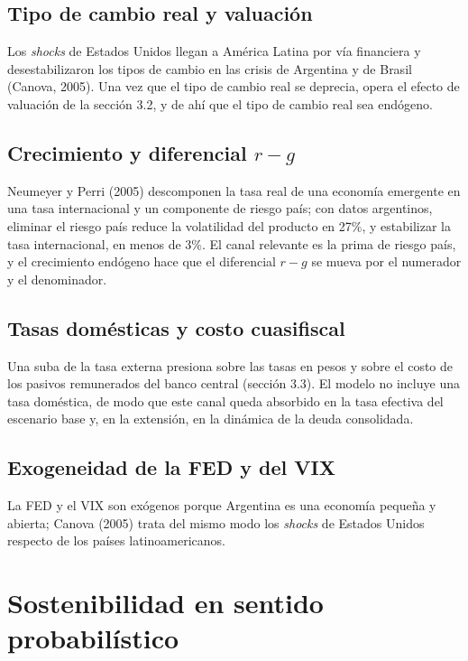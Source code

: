 \subsection{Tipo de cambio real y valuación}

Los \emph{shocks} de Estados Unidos llegan a América Latina por vía
financiera y desestabilizaron los tipos de cambio en las crisis de
Argentina y de Brasil (Canova, 2005). Una vez que el tipo de cambio real
se deprecia, opera el efecto de valuación de la sección 3.2, y de ahí
que el tipo de cambio real sea endógeno.

\subsection{\texorpdfstring{Crecimiento y diferencial
\(r-g\)}{Crecimiento y diferencial r-g}}

Neumeyer y Perri (2005) descomponen la tasa real de una economía
emergente en una tasa internacional y un componente de riesgo país; con
datos argentinos, eliminar el riesgo país reduce la volatilidad del
producto en 27\%, y estabilizar la tasa internacional, en menos de 3\%.
El canal relevante es la prima de riesgo país, y el crecimiento endógeno
hace que el diferencial \(r-g\) se mueva por el numerador y el
denominador.

\subsection{Tasas domésticas y costo cuasifiscal}

Una suba de la tasa externa presiona sobre las tasas en pesos y sobre el
costo de los pasivos remunerados del banco central (sección 3.3). El
modelo no incluye una tasa doméstica, de modo que este canal queda
absorbido en la tasa efectiva del escenario base y, en la extensión, en
la dinámica de la deuda consolidada.

\subsection{Exogeneidad de la FED y del VIX}

La FED y el VIX son exógenos porque Argentina es una economía pequeña y
abierta; Canova (2005) trata del mismo modo los \emph{shocks} de Estados
Unidos respecto de los países latinoamericanos.

\section{Sostenibilidad en sentido probabilístico}

